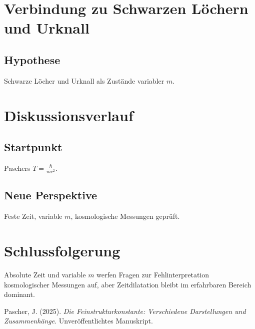 \documentclass{article}
\begin{document}
	\section{Verbindung zu Schwarzen Löchern und Urknall}
	
	\subsection{Hypothese}
	Schwarze Löcher und Urknall als Zustände variabler \( m \).
	
	\section{Diskussionsverlauf}
	
	\subsection{Startpunkt}
	Paschers \( T = \frac{\hbar}{mc^2} \).
	
	\subsection{Neue Perspektive}
	Feste Zeit, variable \( m \), kosmologische Messungen geprüft.
	
	\section{Schlussfolgerung}
	
	Absolute Zeit und variable \( m \) werfen Fragen zur Fehlinterpretation kosmologischer Messungen auf, aber Zeitdilatation bleibt im erfahrbaren Bereich dominant.
	
	\begin{thebibliography}{1}
		 Pascher, J. (2025). \textit{Die Feinstrukturkonstante: Verschiedene Darstellungen und Zusammenhänge}. Unveröffentlichtes Manuskript.
	\end{thebibliography}
	
\end{document}
